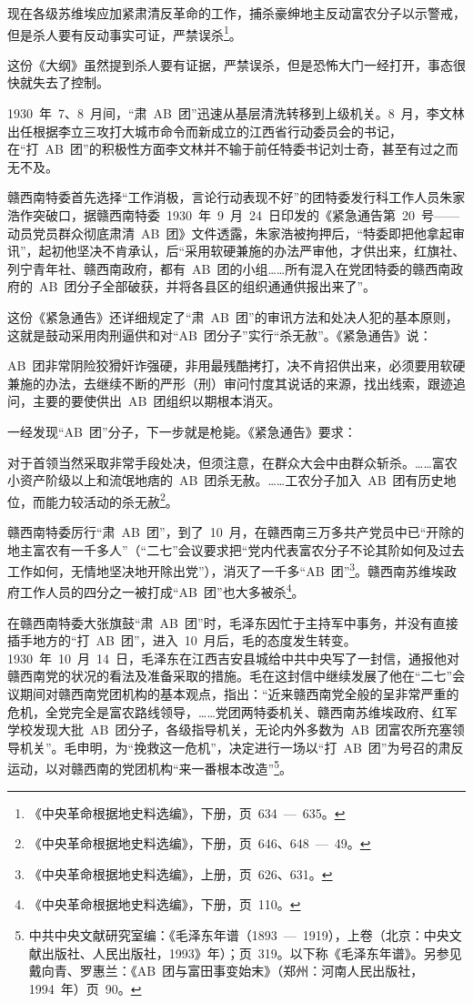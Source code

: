 \begin{quoting}
现在各级苏维埃应加紧肃清反革命的工作，捕杀豪绅地主反动富农分子以示警戒，但是杀人要有反动事实可证，严禁误杀\footnote{《中央革命根据地史料选编》，下册，页~634~—~635。}。
\end{quoting}

这份《大纲》虽然提到杀人要有证据，严禁误杀，但是恐怖大门一经打开，事态很快就失去了控制。

1930~年~7、8~月间，“肃~AB~团”迅速从基层清洗转移到上级机关。8~月，李文林出任根据李立三攻打大城市命令而新成立的江西省行动委员会的书记，在“打~AB~团”的积极性方面李文林并不输于前任特委书记刘士奇，甚至有过之而无不及。

赣西南特委首先选择“工作消极，言论行动表现不好”的团特委发行科工作人员朱家浩作突破口，据赣西南特委~1930~年~9~月~24~日印发的《紧急通告第~20~号——动员党员群众彻底肃清~AB~团》文件透露，朱家浩被拘押后，“特委即把他拿起审讯”，起初他坚决不肯承认，后“采用软硬兼施的办法严审他，才供出来，红旗社、列宁青年社、赣西南政府，都有~AB~团的小组……所有混入在党团特委的赣西南政府的~AB~团分子全部破获，并将各县区的组织通通供报出来了”。

这份《紧急通告》还详细规定了“肃~AB~团”的审讯方法和处决人犯的基本原则，这就是鼓动采用肉刑逼供和对“AB~团分子”实行“杀无赦”。《紧急通告》说：

\begin{quoting}
AB~团非常阴险狡猾奸诈强硬，非用最残酷拷打，决不肯招供出来，必须要用软硬兼施的办法，去继续不断的严形（刑）审问忖度其说话的来源，找出线索，跟迹追问，主要的要使供出~AB~团组织以期根本消灭。
\end{quoting}
一经发现“AB~团”分子，下一步就是枪毙。《紧急通告》要求：

\begin{quoting}
对于首领当然采取非常手段处决，但须注意，在群众大会中由群众斩杀。……富农小资产阶级以上和流氓地痞的~AB~团杀无赦。……工农分子加入~AB~团有历史地位，而能力较活动的杀无赦\footnote{《中央革命根据地史料选编》，下册，页~646、648~—~49。}。
\end{quoting}

赣西南特委厉行“肃~AB~团”，到了~10~月，在赣西南三万多共产党员中已“开除的地主富农有一千多人”（“二七”会议要求把“党内代表富农分子不论其阶如何及过去工作如何，无情地坚决地开除出党”），消灭了一千多“AB~团”\footnote{《中央革命根据地史料选编》，上册，页~626、631。}。赣西南苏维埃政府工作人员的四分之一被打成“AB~团”也大多被杀\footnote{《中央革命根据地史料选编》，下册，页~110。}。

在赣西南特委大张旗鼓“肃~AB~团”时，毛泽东因忙于主持军中事务，并没有直接插手地方的“打~AB~团”，进入~10~月后，毛的态度发生转变。1930~年~10~月~14~日，毛泽东在江西吉安县城给中共中央写了一封信，通报他对赣西南党的状况的看法及准备采取的措施。毛在这封信中继续发展了他在“二七”会议期间对赣西南党团机构的基本观点，指出：“近来赣西南党全般的呈非常严重的危机，全党完全是富农路线领导，……党团两特委机关、赣西南苏维埃政府、红军学校发现大批~AB~团分子，各级指导机关，无论内外多数为~AB~团富农所充塞领导机关”。毛申明，为“挽救这一危机”，决定进行一场以“打~AB~团”为号召的肃反运动，以对赣西南的党团机构“来一番根本改造”\footnote{中共中央文献研究室编：《毛泽东年谱（1893~—~1919），上卷（北京：中央文献出版社、人民出版社，1993》年）；页~319。以下称《毛泽东年谱》。另参见戴向青、罗惠兰：《AB~团与富田事变始末》（郑州：河南人民出版社，1994~年）页~90。}。

